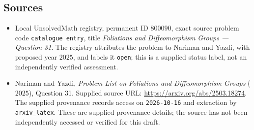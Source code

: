 \documentclass[11pt]{article}
\begin{document}
\subsection{Sources}
\begin{itemize}
\item Local UnsolvedMath registry, permanent ID $800090$, exact source problem code \texttt{catalogue entry}, title \emph{Foliations and Diffeomorphism Groups --- Question 31}. The registry attributes the problem to Nariman and Yazdi, with proposed year $2025$, and labels it \texttt{open}; this is a supplied status label, not an independently verified assessment.
\item Nariman and Yazdi, \emph{Problem List on Foliations and Diffeomorphism Groups} ($2025$), Question 31. Supplied source URL: \url{https://arxiv.org/abs/2503.18274}. The supplied provenance records access on \texttt{2026-10-16} and extraction by \texttt{arxiv\_latex}. These are supplied provenance details; the source has not been independently accessed or verified for this draft.
\end{itemize}
\end{document}
